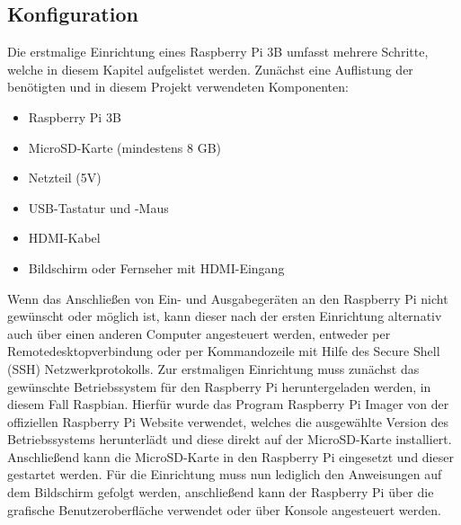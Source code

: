 \documentclass[conference]{IEEEtran}
\begin{document}
\subsection{Konfiguration}
Die erstmalige Einrichtung eines Raspberry Pi 3B umfasst mehrere Schritte, welche in diesem Kapitel aufgelistet werden. Zunächst eine Auflistung der benötigten und in diesem Projekt verwendeten Komponenten:
\begin{itemize}
	\item Raspberry Pi 3B
	\item MicroSD-Karte (mindestens 8 GB)
	\item Netzteil (5V)
	\item USB-Tastatur und -Maus
	\item HDMI-Kabel
	\item Bildschirm oder Fernseher mit HDMI-Eingang
\end{itemize}
Wenn das Anschließen von Ein- und Ausgabegeräten an den Raspberry Pi nicht gewünscht oder möglich ist, kann dieser nach der ersten Einrichtung alternativ auch über einen anderen Computer angesteuert werden, entweder per Remotedesktopverbindung oder per Kommandozeile mit Hilfe des Secure Shell (SSH) Netzwerkprotokolls. \cite{raspy} Zur erstmaligen Einrichtung muss zunächst das gewünschte Betriebssystem für den Raspberry Pi heruntergeladen werden, in diesem Fall Raspbian. Hierfür wurde das Program Raspberry Pi Imager von der offiziellen Raspberry Pi Website verwendet, welches die ausgewählte Version des Betriebssystems herunterlädt und diese direkt auf der MicroSD-Karte installiert. Anschließend kann die MicroSD-Karte in den Raspberry Pi eingesetzt und dieser gestartet werden. Für die Einrichtung muss nun lediglich den Anweisungen auf dem Bildschirm gefolgt werden, anschließend kann der Raspberry Pi über die grafische Benutzeroberfläche verwendet oder über Konsole angesteuert werden.  
\end{document}
